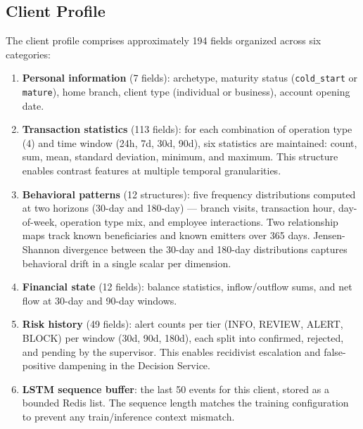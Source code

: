 \subsection{Client Profile}

The client profile comprises approximately 194 fields organized across six categories:

\begin{enumerate}[leftmargin=2cm]
    \item \textbf{Personal information} (7 fields): archetype, maturity status
          (\texttt{cold\_start} or \texttt{mature}), home branch, client type
          (individual or business), account opening date.

    \item \textbf{Transaction statistics} (113 fields): for each combination of
          operation type (4) and time window (24h, 7d, 30d, 90d), six statistics
          are maintained: count, sum, mean, standard deviation, minimum, and maximum.
          This structure enables contrast features at multiple temporal granularities.

    \item \textbf{Behavioral patterns} (12 structures): five frequency distributions
          computed at two horizons (30-day and 180-day) --- branch visits, transaction
          hour, day-of-week, operation type mix, and employee interactions. Two
          relationship maps track known beneficiaries and known emitters over 365 days.
          Jensen-Shannon divergence between the 30-day and 180-day distributions
          captures behavioral drift in a single scalar per dimension.

    \item \textbf{Financial state} (12 fields): balance statistics, inflow/outflow
          sums, and net flow at 30-day and 90-day windows.

    \item \textbf{Risk history} (49 fields): alert counts per tier (INFO, REVIEW,
          ALERT, BLOCK) per window (30d, 90d, 180d), each split into confirmed,
          rejected, and pending by the supervisor. This enables recidivist escalation
          and false-positive dampening in the Decision Service.

    \item \textbf{LSTM sequence buffer}: the last 50 events for this client, stored
          as a bounded Redis list. The sequence length matches the training configuration
          to prevent any train/inference context mismatch.
\end{enumerate}

